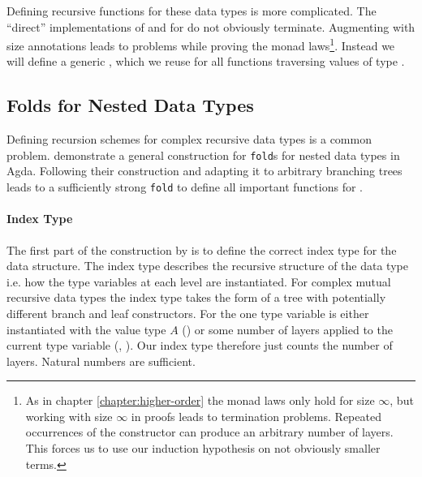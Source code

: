 Defining recursive functions for these data types is more complicated.
The ``direct'' implementations of \AgdaFunction{<\$>} and \AgdaFunction{>>=} for
\AgdaSpace{}\AgdaSpace{}
do not obviously terminate.
Augmenting
\AgdaSpace{}\AgdaSpace{}
with size annotations leads to problems while
proving the monad laws\footnote{As in chapter \ref{chapter:higher-order} the
  monad laws only hold for size $\infty$, but working with size $\infty$ in
  proofs leads to termination problems.
  Repeated occurrences of the  constructor can
  produce an arbitrary number of
  \AgdaSpace{} layers.
  This forces us to use our induction hypothesis on not obviously smaller
  terms.}.
Instead we will define a generic , which we reuse for all
functions traversing values of type
\AgdaSpace{}\AgdaSpace{}.


\subsection{Folds for Nested Data Types}
\label{scoped-algebra:fold}

Defining recursion schemes for complex recursive data types is a common problem.
\textcite{DBLP:journals/corr/abs-1806-05230} demonstrate a general construction
for \texttt{fold}s for nested data types in Agda.
Following their construction and adapting it to arbitrary branching trees leads
to a sufficiently strong \texttt{fold} to define all important functions for
\AgdaSpace{}\AgdaSpace{}.

\paragraph{Index Type} The first part of the construction by
\textcite{DBLP:journals/corr/abs-1806-05230} is to define the correct index type
for the data structure.
The index type describes the recursive structure of the data type i.e. how the
type variables at each level are instantiated.
For complex mutual recursive data types the index type takes the form of a tree
with potentially different branch and leaf constructors.
For \AgdaSpace{}
the one type variable is either instantiated with the value type $A$
() or some number of
\AgdaSpace{} layers applied to
the current type variable (,
).
Our index type therefore just counts the number of
\AgdaSpace{} layers.
Natural numbers are sufficient.

